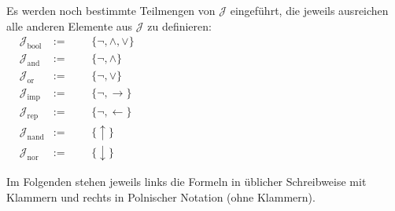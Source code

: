 \documentclass[english,ngerman,parskip=half,headsepline,footsepline,
	fleqn,notitlepage]{scrreprt}
\newcommand*{\defeq}{:=}%
\newcommand*{\lrep}{\leftarrow}%
\newcommand*{\limp}{\rightarrow}%
\newcommand*{\lnand}{\uparrow}%
\newcommand*{\lnor}{\downarrow}%
\newcommand*{\asJ}{\mathcal{J}}%
\newcommand*{\xAnd}{\mathrm{and}}%
\newcommand*{\xBool}{\mathrm{bool}}%
\newcommand*{\xImp}{\mathrm{imp}}%
\newcommand*{\xNand}{\mathrm{nand}}%
\newcommand*{\xNor}{\mathrm{nor}}%
\newcommand*{\xOr}{\mathrm{or}}%
\newcommand*{\xRep}{\mathrm{rep}}%
\newcommand*{\formulatoleft}{&&&&&&&&&&}%
\begin{document}
	Es werden noch bestimmte Teilmengen von $\asJ$ eingeführt,
	die jeweils ausreichen alle anderen Elemente aus $\asJ$ zu definieren:
	\begin{align}
		& \asJ_\xBool &\defeq & & & \{ \lnot, \land, \lor \} \label{def:Jbool}\\
		& \asJ_\xAnd  &\defeq & & & \{ \lnot, \land       \} \label{def:Jand} \\
		& \asJ_\xOr   &\defeq & & & \{ \lnot, \lor        \} \label{def:Jor}  \\
		& \asJ_\xImp  &\defeq & & & \{ \lnot, \limp       \} \label{def:Jimp} \\
		& \asJ_\xRep  &\defeq & & & \{ \lnot, \lrep       \} \label{def:Jrep} \\
		& \asJ_\xNand &\defeq & & & \{ \lnand             \} \label{def:Jnand}\\
		& \asJ_\xNor  &\defeq & & & \{ \lnor              \} \label{def:Jnor}
		\formulatoleft\formulatoleft\formulatoleft\formulatoleft\formulatoleft
	\end{align}

	Im Folgenden stehen jeweils
	links die Formeln in üblicher Schreibweise mit Klammern
	und rechts in Polnischer Notation (ohne Klammern).
\end{document}
